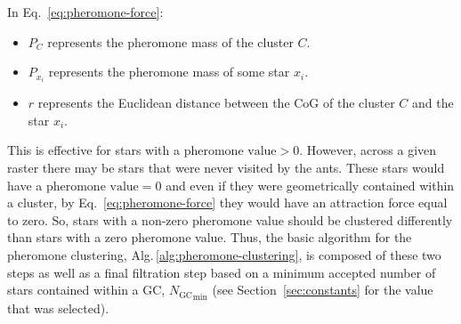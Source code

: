 \noindent{}%
In Eq.~\eqref{eq:pheromone-force}:
\begin{itemize}
    \item $P_{C}$ represents the pheromone mass of the cluster $C$.
    \item $P_{x_{i}}$ represents the pheromone mass of some star $x_{i}$.
    \item $r$ represents the Euclidean distance between the CoG of the cluster $C$ and the star $x_{i}$.
\end{itemize}
This is effective for stars with a $\text{pheromone value} > 0$. However, across a given raster there may be stars that were never visited by the ants. These stars would have a $\text{pheromone value} = 0$ and even if they were geometrically contained within a cluster, by Eq.~\eqref{eq:pheromone-force} they would have an attraction force equal to zero. So, stars with a non-zero pheromone value should be clustered differently than stars with a zero pheromone value. Thus, the basic algorithm for the pheromone clustering, Alg.\,\ref{alg:pheromone-clustering}, is composed of these two steps as well as a final filtration step based on a minimum accepted number of stars contained within a GC, ${N_{\text{GC}}}_{\text{min}}$ (see Section~\ref{sec:constants} for the value that was selected).
\vspace{-0.5em}
